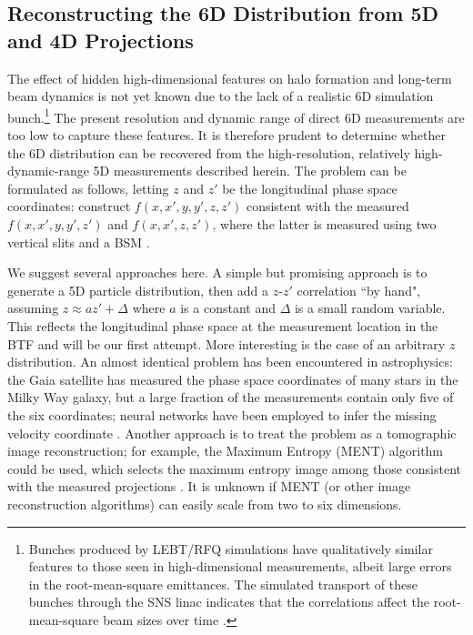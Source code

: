 \documentclass[letterpaper,
               nospread,
               biblatex,
              ]{jacow}
\begin{document}
\subsection{Reconstructing the 6D Distribution from 5D and 4D Projections}

The effect of hidden high-dimensional features on halo formation and long-term beam dynamics is not yet known due to the lack of a realistic 6D simulation bunch.\footnote{
   Bunches produced by LEBT/RFQ simulations have qualitatively similar features to those seen in high-dimensional measurements, albeit large errors in the root-mean-square emittances. The simulated transport of these bunches through the SNS linac indicates that the correlations affect the root-mean-square beam sizes over time \cite{Ruisard2021-IPAC}.
} The present resolution and dynamic range of direct 6D measurements are too low to capture these features. It is therefore prudent to determine whether the 6D distribution can be recovered from the high-resolution, relatively high-dynamic-range 5D measurements described herein. The problem can be formulated as follows, letting $z$ and $z'$ be the longitudinal phase space coordinates: construct $f(x, x', y, y', z, z')$ consistent with the measured $f(x, x', y, y', z')$ and $f(x, x', z, z')$, where the latter is measured using two vertical slits and a BSM \cite{Ruisard2020}. 

We suggest several approaches here. A simple but promising approach is to generate a 5D particle distribution, then add a $z$-$z'$ correlation ``by hand", assuming $z \approx az' + \Delta$ where $a$ is a constant and $\Delta$ is a small random variable. This reflects the longitudinal phase space at the measurement location in the BTF and will be our first attempt. More interesting is the case of an arbitrary $z$ distribution. An almost identical problem has been encountered in astrophysics: the Gaia satellite has measured the phase space coordinates of many stars in the Milky Way galaxy, but a large fraction of the measurements contain only five of the six coordinates; neural networks have been employed to infer the missing velocity coordinate \cite{Dropulic2021}. Another approach is to treat the problem as a tomographic image reconstruction; for example, the Maximum Entropy (MENT) algorithm could be used, which selects the maximum entropy image among those consistent with the measured projections \cite{Skilling1984}. It is unknown if MENT (or other image reconstruction algorithms) can easily scale from two to six dimensions.
\end{document}
